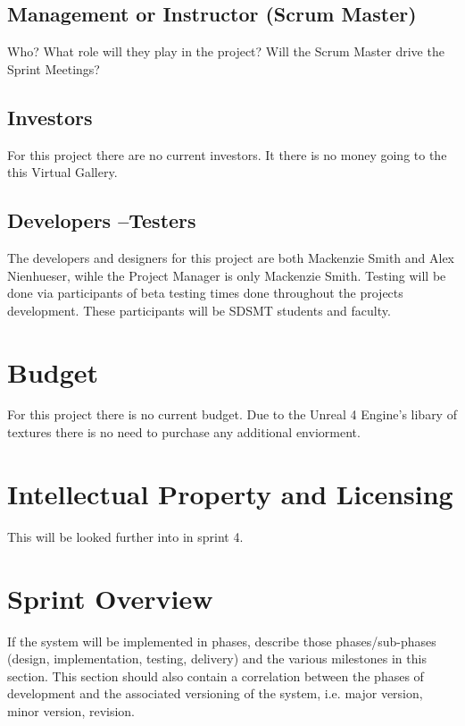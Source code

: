 \subsection{Management or Instructor (Scrum Master)}
Who?  What role will they play in the project?  Will the Scrum Master drive the 
Sprint Meetings? 


\subsection{Investors}
For this project there are no current investors. It there is no money going to the this Virtual Gallery.


\subsection{Developers --Testers}
The developers and designers for this project are both Mackenzie Smith and Alex Nienhueser, wihle the Project Manager is only Mackenzie Smith. Testing will be done via participants of beta testing times done throughout the projects development. These participants will be SDSMT students and faculty. 

\section{Budget}
For this project there is no current budget. Due to the Unreal 4 Engine's libary of textures there is no need to purchase any additional enviorment. 

\section{Intellectual Property and Licensing}
This will be looked further into in sprint 4.

\section{Sprint  Overview}
If the system will be implemented in phases, describe those phases/sub-phases (design, 
implementation, testing, delivery) and the various milestones in this section. 
 This section should also contain a correlation between the phases of development 
and the associated versioning of the system, i.e. major version, minor version, 
revision. 

